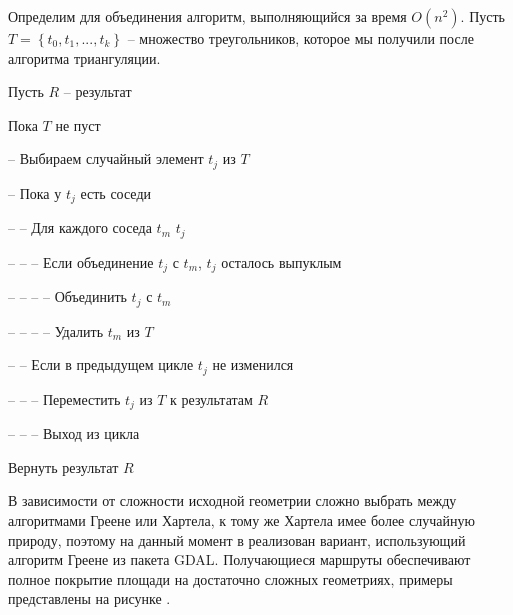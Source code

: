 Определим для объединения алгоритм, выполняющийся за время $O(n^2)$. Пусть $T=\left\lbrace t_0, t_1, ..., t_k \right\rbrace $ -- множество треугольников, которое мы получили после алгоритма триангуляции.

Пусть $R$ -- результат

Пока $T$ не пуст

-- Выбираем случайный элемент $t_j$ из $T$

-- Пока у $t_j$ есть соседи

-- -- Для каждого соседа $t_m$ $t_j$

-- -- -- Если объединение $t_j$ с $t_m$, $t_j$ осталось выпуклым

-- -- -- -- Объединить $t_j$ с $t_m$

-- -- -- -- Удалить $t_m$ из $T$

-- -- Если в предыдущем цикле $t_j$ не изменился

-- -- -- Переместить $t_j$ из $T$ к результатам $R$

-- -- -- Выход из цикла

Вернуть результат $R$


В зависимости от сложности исходной геометрии сложно выбрать между алгоритмами Греене или Хартела, к тому же Хартела имее более случайную природу, поэтому на данный момент в реализован вариант, использующий алгоритм Греене из пакета GDAL. Получающиеся маршруты обеспечивают полное покрытие площади на достаточно сложных геометриях, примеры представлены на рисунке .

